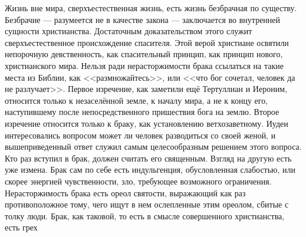 \documentclass[12pt,oneside]{book}
\begin{document}
Жизнь вне мира, сверхъестественная жизнь, есть жизнь безбрачная по существу. Безбрачие --- разумеется не в качестве закона --- заключается во внутренней сущности христианства. Достаточным доказательством этого служит сверхъестественное происхождение спасителя. Этой верой христиане освятили непорочную девственность, как спасительный принцип, как принцип нового, христианского мира. Нельзя ради нерасторжимости брака ссылаться на такие места из Библии, как <<размножайтесь>>, или <<что бог сочетал, человек да не разлучает>>. Первое изречение, как заметили ещё Тертуллиан и Иероним, относится только к незаселённой земле, к началу мира, а не к концу его, наступившему после непосредственного пришествия бога на землю. Второе изречение относится только к браку, как установлению ветхозаветному. Иудеи интересовались вопросом может ли человек разводиться со своей женой, и вышеприведенный ответ служил самым целесообразным решением этого вопроса. Кто раз вступил в брак, должен считать его священным. Взгляд на другую есть уже измена. Брак сам по себе есть индульгенция, обусловленная слабостью, или скорее энергией чувственности, зло, требующее возможного ограничения. Нерасторжимость брака есть ореол святости, выражающий как раз противоположное тому, чего ищут в нем ослепленные этим ореолом, сбитые с толку люди. Брак, как таковой, то есть в смысле совершенного христианства, есть грех
\end{document}
